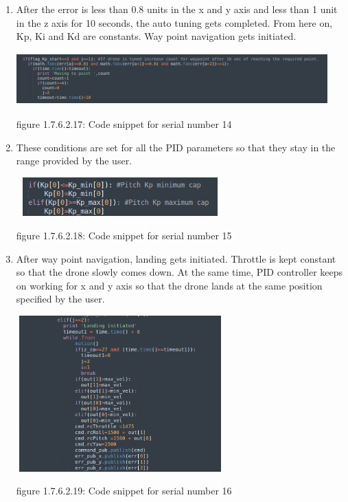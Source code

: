 \documentclass[a4paper,12pt,oneside]{book}
\begin{document}
\begin{enumerate}
\item After the error is less than 0.8 units in the x and y axis and less than 1 unit in the z axis for 10 seconds, the auto tuning gets completed. From here on, Kp, Ki and Kd are constants. Way point navigation gets initiated.


\includegraphics[width = 12cm , height= 2cm]{PID_err_8(7).png}
\begin{center}
    figure 1.7.6.2.17: Code snippet for serial number 14
\end{center}

\item These conditions are set for all the PID parameters so that they stay in the range provided by the user.


\includegraphics[width = 8cm , height= 1.5cm]{PID_err_8(8).png}
\begin{center}
    figure 1.7.6.2.18: Code snippet for serial number 15
\end{center}

\item After way point navigation, landing gets initiated. Throttle is kept constant so that the drone slowly comes down. At the same time, PID controller keeps on working for x and y axis so that the drone lands at the same position specified by the user.


\includegraphics[width = 8cm , height= 6cm]{landing.png}
\begin{center}
    figure 1.7.6.2.19: Code snippet for serial number 16
\end{center}


\end{enumerate}
\end{document}
